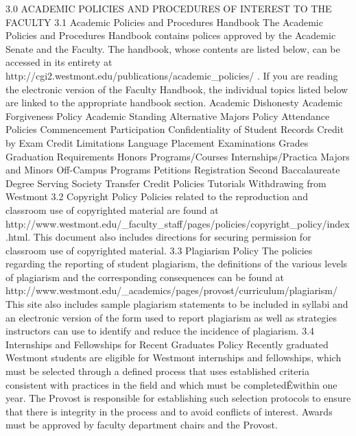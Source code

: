 \documentclass[letterpaper, 11pt]{article}
\begin{document}
3.0 ACADEMIC POLICIES AND PROCEDURES OF INTEREST TO THE FACULTY
3.1 Academic Policies and Procedures Handbook
   The Academic Policies and Procedures Handbook contains polices approved by the Academic Senate and the Faculty.  The handbook, whose contents are listed below, can be accessed in its entirety at http://cgi2.westmont.edu/publications/academic_policies/ . 
   If you are reading the electronic version of the Faculty Handbook, the individual topics listed below are linked to the appropriate handbook section.
Academic Dishonesty
Academic Forgiveness Policy
Academic Standing 
Alternative Majors Policy 
Attendance Policies
Commencement Participation
Confidentiality of Student Records 
Credit by Exam 
Credit Limitations 
Language Placement 
Examinations 
Grades 
Graduation Requirements 
Honors Programs/Courses 
Internships/Practica 
Majors and Minors 
Off-Campus Programs 
Petitions 
Registration 
Second Baccalaureate Degree 
Serving Society 
Transfer Credit Policies 
Tutorials 
Withdrawing from Westmont
3.2 Copyright Policy
   Policies related to the reproduction and classroom use of copyrighted material are found at http://www.westmont.edu/_faculty_staff/pages/policies/copyright_policy/index.html.
   This document also includes directions for securing permission for classroom use of copyrighted material.
3.3 Plagiarism Policy
   The policies regarding the reporting of student plagiarism, the definitions of the various levels of plagiarism and the corresponding consequences can be found at http://www.westmont.edu/_academics/pages/provost/curriculum/plagiarism/ 
   This site also includes sample plagiarism statements to be included in syllabi and an electronic version of the form used to report plagiarism as well as strategies instructors can use to identify and reduce the incidence of plagiarism.
3.4 Internships and Fellowships for Recent Graduates Policy
   Recently graduated Westmont students are eligible for Westmont internships and fellowships, which must be selected through a defined process that uses established criteria consistent with practices in the field and which must be completedÊwithin one year. The Provost is responsible for establishing such selection protocols to ensure that there is integrity in the process and to avoid conflicts of interest. Awards must be approved by faculty department chairs and the Provost.
   
\end{document}
